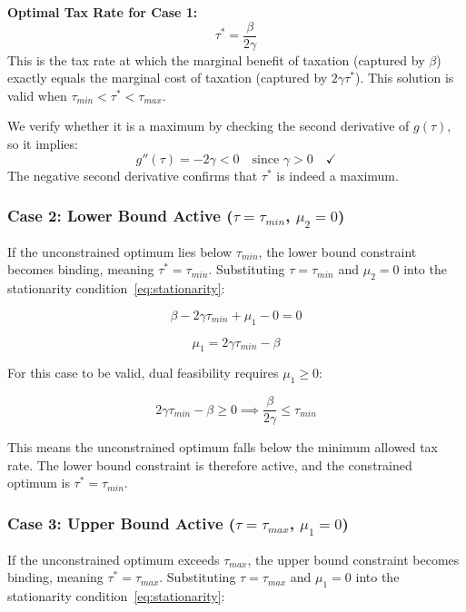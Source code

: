 \documentclass[12pt,a4paper]{report}
\theoremstyle{definition}
\theoremstyle{plain}
\theoremstyle{remark}
\newcommand{\taustar}{\tau^{*}}
\begin{document}
	\begin{keybox}
		\textbf{Optimal Tax Rate for Case 1:}
		\[
		\taustar = \frac{\beta}{2\gamma}
		\]
		This is the tax rate at which the marginal benefit of 
		taxation (captured by $\beta$) exactly equals the marginal 
		cost of taxation (captured by $2\gamma\taustar$). This 
		solution is valid when $\tau_{min} < \taustar < \tau_{max}$.
	\end{keybox}
	
	We verify whether it is a maximum by checking the second derivative 
	of $g(\tau)$, so it implies:
	\[
	g''(\tau) = -2\gamma < 0 \quad \text{since } \gamma > 0 
	\quad \checkmark
	\]
	The negative second derivative confirms that $\taustar$ is 
	indeed a maximum.
	
	\subsubsection*{Case 2: Lower Bound Active 
		($\tau = \tau_{min}$, $\mu_2 = 0$)}
	
	If the unconstrained optimum lies below $\tau_{min}$, the 
	lower bound constraint becomes binding, meaning 
	$\tau^* = \tau_{min}$. Substituting $\tau = \tau_{min}$ 
	and $\mu_2 = 0$ into the stationarity 
	condition~\eqref{eq:stationarity}:
	
	\begin{equation}
		\beta - 2\gamma\tau_{min} + \mu_1 - 0 = 0
	\end{equation}
	
	\begin{equation}
		\mu_1 = 2\gamma\tau_{min} - \beta
		\label{eq:case2_mu1}
	\end{equation}
	
	For this case to be valid, dual feasibility requires 
	$\mu_1 \geq 0$:
	
	\[
	2\gamma\tau_{min} - \beta \geq 0 \implies 
	\frac{\beta}{2\gamma} \leq \tau_{min}
	\]
	
	This means the unconstrained optimum falls below the minimum 
	allowed tax rate. The lower bound constraint is therefore 
	active, and the constrained optimum is 
	$\taustar = \tau_{min}$.
	
	\subsubsection*{Case 3: Upper Bound Active 
		($\tau = \tau_{max}$, $\mu_1 = 0$)}
	
	If the unconstrained optimum exceeds $\tau_{max}$, the upper 
	bound constraint becomes binding, meaning 
	$\tau^* = \tau_{max}$. Substituting $\tau = \tau_{max}$ 
	and $\mu_1 = 0$ into the stationarity 
	condition~\eqref{eq:stationarity}:
	
\end{document}
